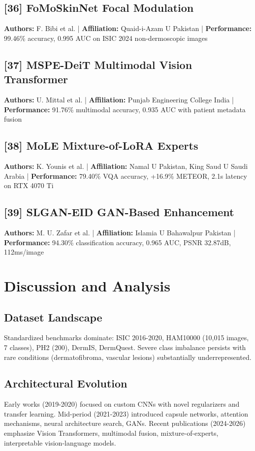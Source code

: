 \documentclass[10pt,twocolumn]{article}
\begin{document}
\subsection*{[36] FoMoSkinNet Focal Modulation}
\textbf{Authors:} F. Bibi et al. | \textbf{Affiliation:} Quaid-i-Azam U Pakistan | \textbf{Performance:} 99.46\% accuracy, 0.995 AUC on ISIC 2024 non-dermoscopic images

\subsection*{[37] MSPE-DeiT Multimodal Vision Transformer}
\textbf{Authors:} U. Mittal et al. | \textbf{Affiliation:} Punjab Engineering College India | \textbf{Performance:} 91.76\% multimodal accuracy, 0.935 AUC with patient metadata fusion

\subsection*{[38] MoLE Mixture-of-LoRA Experts}
\textbf{Authors:} K. Younis et al. | \textbf{Affiliation:} Namal U Pakistan, King Saud U Saudi Arabia | \textbf{Performance:} 79.40\% VQA accuracy, +16.9\% METEOR, 2.1s latency on RTX 4070 Ti

\subsection*{[39] SLGAN-EID GAN-Based Enhancement}
\textbf{Authors:} M. U. Zafar et al. | \textbf{Affiliation:} Islamia U Bahawalpur Pakistan | \textbf{Performance:} 94.30\% classification accuracy, 0.965 AUC, PSNR 32.87dB, 112ms/image

\section{Discussion and Analysis}

\subsection{Dataset Landscape}
Standardized benchmarks dominate: ISIC 2016-2020, HAM10000 (10,015 images, 7 classes), PH2 (200), DermIS, DermQuest. Severe class imbalance persists with rare conditions (dermatofibroma, vascular lesions) substantially underrepresented.

\subsection{Architectural Evolution}
Early works (2019-2020) focused on custom CNNs with novel regularizers and transfer learning. Mid-period (2021-2023) introduced capsule networks, attention mechanisms, neural architecture search, GANs. Recent publications (2024-2026) emphasize Vision Transformers, multimodal fusion, mixture-of-experts, interpretable vision-language models.
\end{document}
